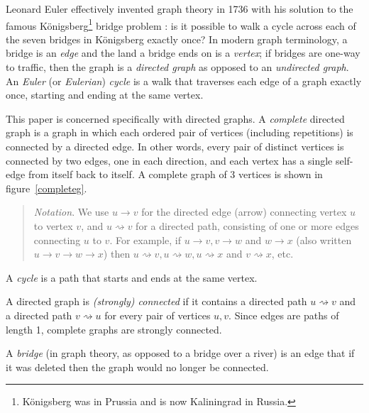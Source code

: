 \documentclass[preprint,times]{elsarticle}
\begin{document}
Leonard Euler effectively invented graph theory in 1736 with his solution to the famous K\"onigsberg\footnote{K\"onigsberg was in Prussia and is now Kaliningrad in Russia.} bridge problem \cite{euler,wilson}: is it possible to walk a cycle across each of the seven bridges in K\"onigsberg exactly once? In modern graph terminology, a bridge is an \emph{edge\/} and the land a bridge ends on is a \emph{vertex\/}; if bridges are one-way to traffic, then the graph is a \emph{directed graph\/} as opposed to an \emph{undirected graph\/}. An \emph{Euler\/} (or \emph{Eulerian\/}) \emph{cycle\/} is a walk that traverses each edge of a graph exactly once, starting and ending at the same vertex.%

This paper is concerned specifically with directed graphs. A \emph{complete\/} directed graph is a graph in which each ordered pair of vertices (including repetitions) is connected by a directed edge. In other words, every pair of distinct vertices is connected by two edges, one in each direction, and each vertex has a single self-edge from itself back to itself. A complete graph of 3 vertices is shown in figure~\ref{completeg}. 

\begin{quote}\raggedright\emph{Notation}.
We use $u \rightarrow v$ for the directed edge (arrow) connecting vertex $u$ to vertex $v$, and $u \rightsquigarrow v$ for a directed path, consisting of one or more edges connecting $u$ to $v$. For example, if $u \rightarrow v, v \rightarrow w$ and $w \rightarrow x$ (also written $u \rightarrow v \rightarrow w \rightarrow x$) then $u \rightsquigarrow v, u \rightsquigarrow w, u \rightsquigarrow x$ and $v \rightsquigarrow x$, etc.

\end{quote}

A \emph{cycle\/} is a path that starts and ends at the same vertex.

A directed graph is \emph{(strongly) connected\/} if it contains a directed path $u \rightsquigarrow v$ and a directed path $v \rightsquigarrow u$ for every pair of vertices $u,v$. Since edges are paths of length 1, complete graphs are strongly connected.

A \emph{bridge}  (in graph theory, as opposed to a bridge over a river) is an edge that if it was deleted then the graph would no longer be connected.
\end{document}
